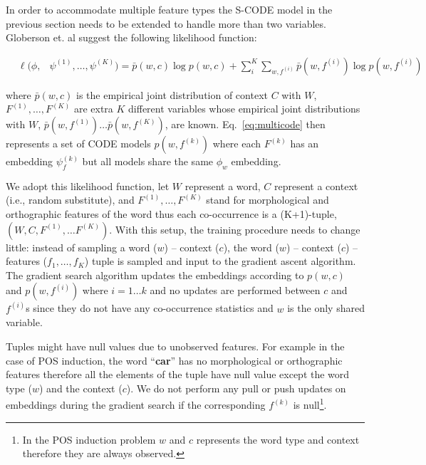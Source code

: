 
In order to accommodate multiple feature types the S-CODE model in the
previous section needs to be extended to handle more than two
variables.  Globerson et. al 
suggest the following likelihood function:

\begin{eqnarray}
&\ell(\phi,& \psi^{(1)}, \ldots, \psi^{(K)}) = \label{eq:multicode}
  \bar{p}(w,c) \log p(w,c) + \sum_i^K \sum_{w,f^{(i)}} \bar{p}(w,f^{(i)}) \log p(w,f^{(i)})
\end{eqnarray}

\noindent where $\bar{p}(w,c)$ is the empirical joint distribution of
context $C$ with $W$, $F^{(1)}, \ldots, F^{(K)}$ are extra $K$
different variables whose empirical joint distributions with $W$,
$\bar{p}(w,f^{(1)})\ldots\bar{p}(w,f^{(K)})$, are known.
Eq.~\ref{eq:multicode} then represents a set of CODE models
$p(w,f^{(k)})$ where each $F^{(k)}$ has an embedding $\psi_f^{(k)}$
but all models share the same $\phi_w$ embedding.

We adopt this likelihood function, let $W$ represent a word, $C$
represent a context (i.e., random substitute), and $F^{(1)}, \ldots,
F^{(K)}$ stand for morphological and orthographic features of the word
thus each co-occurrence is a (K+1)-tuple, $(W, C, F^{(1)}, \hdots
F^{(K)})$.  With this setup, the training procedure needs to change
little: instead of sampling a word ($w$) -- context ($c$), the word
($w$) -- context ($c$) -- features ($f_1,\hdots,f_K$) tuple is sampled
and input to the gradient ascent algorithm.  The gradient search
algorithm updates the embeddings according to $p(w,c)$ and
$p(w,f^{(i)})$ where $i=1\hdots k$ and no updates are performed
between $c$ and $f^{(i)}$s since they do not have any co-occurrence
statistics and $w$ is the only shared variable.

Tuples might have null values due to unobserved features.  For example
in the case of POS induction, the word ``\textbf{car}'' has no
morphological or orthographic features therefore all the elements of
the tuple have null value except the word type ($w$) and the context
($c$).  We do not perform any pull or push updates on embeddings
during the gradient search if the corresponding $f^{(k)}$ is
null\footnote{In the POS induction problem $w$ and $c$ represents the
  word type and context therefore they are always observed.}.


